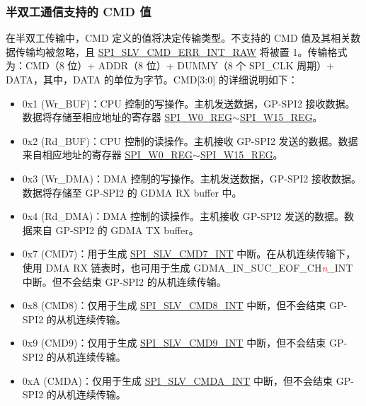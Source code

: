 \documentclass[main\_\_CN.tex]{subfiles}
\begin{document}
\subsubsection{半双工通信支持的 CMD 值} \label{GP-SPI2 HD salve format}

在半双工传输中，CMD 定义的值将决定传输类型。不支持的 CMD 值及其相关数据传输均被忽略，且 \hyperref[fielddesc:SPISLVCMDERRINTRAW]{SPI\_SLV\_CMD\_ERR\_INT\_RAW} 将被置 1。传输格式为：CMD（8 位）+ ADDR（8 位）+ DUMMY（8 个 SPI\_CLK 周期）+ DATA，其中，DATA 的单位为字节。CMD[3:0] 的详细说明如下：


\begin{itemize}
    \item \label{cmd:wrbuf} 0x1 (Wr\_BUF)：CPU 控制的写操作。主机发送数据，GP-SPI2 接收数据。数据将存储至相应地址的寄存器 \hyperref[regdesc:SPIW0REG]{SPI\_W0\_REG}$\sim$\hyperref[regdesc:SPIW15REG]{SPI\_W15\_REG}。

    \item \label{cmd:rdbuf} 0x2 (Rd\_BUF)：CPU 控制的读操作。主机接收 GP-SPI2 发送的数据。数据来自相应地址的寄存器 \hyperref[regdesc:SPIW0REG]{SPI\_W0\_REG}$\sim$\hyperref[regdesc:SPIW15REG]{SPI\_W15\_REG}。

    \item \label{cmd:wrdma} 0x3 (Wr\_DMA)：DMA 控制的写操作。主机发送数据，GP-SPI2 接收数据。数据将存储至 GP-SPI2 的 GDMA RX buffer 中。

    \item \label{cmd:rddma} 0x4 (Rd\_DMA)：DMA 控制的读操作。主机接收 GP-SPI2 发送的数据。数据来自 GP-SPI2 的 GDMA TX buffer。

    \item \label{cmd:CMD7} 0x7 (CMD7)：用于生成 \hyperref[int:SPISLVCMD7INT]{SPI\_SLV\_CMD7\_INT} 中断。在从机连续传输下，使用 DMA RX 链表时，也可用于生成 GDMA\_IN\_SUC\_EOF\_CH\textcolor{red}{\it{n}}\_INT  中断。但不会结束 GP-SPI2 的从机连续传输。

    \item 0x8 (CMD8)：仅用于生成 \hyperref[int:SPISLVCMD8INT]{SPI\_SLV\_CMD8\_INT} 中断，但不会结束 GP-SPI2 的从机连续传输。

    \item 0x9 (CMD9)：仅用于生成 \hyperref[int:SPISLVCMD9INT]{SPI\_SLV\_CMD9\_INT} 中断，但不会结束 GP-SPI2 的从机连续传输。

    \item 0xA (CMDA)：仅用于生成 \hyperref[int:SPISLVCMDAINT]{SPI\_SLV\_CMDA\_INT} 中断，但不会结束 GP-SPI2 的从机连续传输。

\end{itemize}
\end{document}
